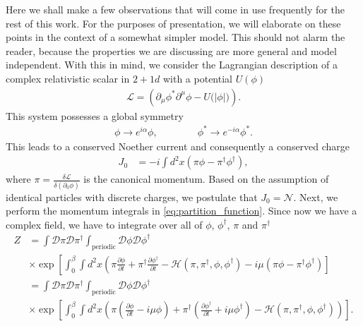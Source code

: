 Here we shall make a few observations that will come in use frequently for the rest of this work. For the purposes of presentation, we will elaborate on these points in the context of a somewhat simpler model. This should not alarm the reader, because the properties we are discussing are more general and model independent. With this in mind, we consider the Lagrangian description of a complex relativistic scalar in $2+1d$ with a potential $U(\phi)$
        \begin{align}
            \mathcal{L} = \left(\partial_{\mu}\phi^{*} \partial^{\mu} \phi  - U\big(|\phi|\big)\right).
        \end{align}
        This system possesses a global symmetry
        \begin{align}
            \phi \rightarrow e^{i \alpha} \phi, \qquad\qquad \phi^* \rightarrow e^{-i \alpha} \phi^*.
        \end{align}
        This leads to a conserved Noether current and consequently a conserved charge
        \begin{align}
            J_{0} &= -i \int d^2x \left( \pi \phi - \pi^{\dag}\phi^{\dag}\right),
        \end{align}
        where $\pi = \frac{\delta \mathcal{L}}{\delta ( \partial_0 \phi)}$ is the canonical momentum. Based on the assumption of identical particles with discrete charges, we postulate that $J_0 = \mathcal{N}$. Next, we perform the momentum integrals in \eqref{eq:partition_function}. Since now we have a complex field, we have to integrate over all of $\phi$, $\phi^{\dag}$, $\pi$ and $\pi^{\dag}$
        \begin{align}
            Z &= \int \mathcal{D} \pi \mathcal{D} \pi^{\dag} \int_{\text{periodic}} \mathcal{D} \phi \mathcal{D} \phi^{\dag} \nonumber \\
            &\times \exp \left[ \int_0^{\beta} \int d^2x \left(\pi \frac{\partial \phi}{\partial t} +\pi^{\dag} \frac{\partial \phi^{\dag}}{\partial t} - \mathcal{H}(\pi, \pi^{\dag}, \phi, \phi^{\dag}) - i  \mu \left(\pi \phi - \pi^{\dag}\phi^{\dag} \right) \right] \label{eq:partition_function_complex_scalar} \nonumber \\
            &= \int \mathcal{D} \pi \mathcal{D} \pi^{\dag} \int_{\text{periodic}} \mathcal{D} \phi \mathcal{D} \phi^{\dag} \nonumber \\
            &\times \exp \left[ \int_0^{\beta} \int d^2x \left(\pi \left( \frac{\partial \phi}{\partial t} -i \mu \phi \right) +\pi^{\dag} \left( \frac{\partial \phi^{\dag}}{\partial t} +i \mu \phi^{\dag} \right) - \mathcal{H}(\pi, \pi^{\dag}, \phi, \phi^{\dag}) \right) \right]. \label{eq:partition_function_complex_scalar}
        \end{align}

